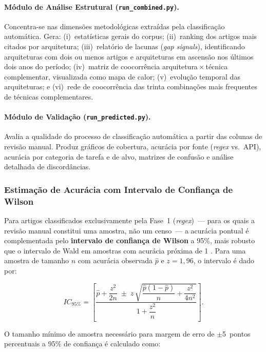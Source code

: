 \paragraph{Módulo de Análise Estrutural (\texttt{run\_combined.py}).}
Concentra-se nas dimensões metodológicas extraídas pela classificação
automática. Gera: (i)~estatísticas gerais do corpus; (ii)~ranking
dos artigos mais citados por arquitetura; (iii)~relatório de lacunas
(\textit{gap signals}), identificando arquiteturas com dois ou menos
artigos e arquiteturas em ascensão nos últimos dois anos do período;
(iv)~matriz de coocorrência arquitetura\,$\times$\,técnica
complementar, visualizada como mapa de calor; (v)~evolução temporal
das arquiteturas; e (vi)~rede de coocorrência das trinta combinações
mais frequentes de técnicas complementares.

\paragraph{Módulo de Validação (\texttt{run\_predicted.py}).}
Avalia a qualidade do processo de classificação automática a partir
das colunas de revisão manual. Produz gráficos de cobertura,
acurácia por fonte (\textit{regex} vs.\ API), acurácia por categoria
de tarefa e de alvo, matrizes de confusão e análise detalhada de
discordâncias.


\subsubsection{Estimação de Acurácia com Intervalo de Confiança de
              Wilson}

Para artigos classificados exclusivamente pela Fase~1
(\textit{regex})~--- para os quais a revisão manual constitui uma
amostra, não um censo~--- a acurácia pontual é complementada pelo
\textbf{intervalo de confiança de Wilson} a 95\%, mais robusto que
o intervalo de Wald em amostras com acurácia próxima de 1
\cite{wilson1927}. Para uma amostra de tamanho $n$ com acurácia
observada $\hat{p}$ e $z = 1{,}96$, o intervalo é dado por:

\begin{equation}
\label{eq:wilson}
  IC_{95\%}
  =
  \left[
    \frac{
      \hat{p} + \dfrac{z^{2}}{2n}
      \;\pm\;
      z\,\sqrt{\dfrac{\hat{p}(1-\hat{p})}{n}
               + \dfrac{z^{2}}{4n^{2}}}
    }{
      1 + \dfrac{z^{2}}{n}
    }
  \right].
\end{equation}

O tamanho mínimo de amostra necessário para margem de erro de
$\pm$5~pontos percentuais a 95\% de confiança é calculado como:

